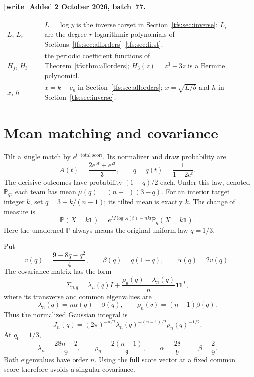 \documentclass[11pt,a4paper]{article}
\numberwithin{equation}{section}
\theoremstyle{remark}
\newcommand{\Prob}{\mathbb P}
\newcommand{\1}{\mathbf 1}
\newenvironment{writenote}[1][]{\par\smallskip\begingroup\small
 \noindent\textbf{[write]}\if\relax\detokenize{#1}\relax\else~\textbf{#1.}\fi\ }%
 {\par\endgroup\smallskip}
\begin{document}
\begin{writenote}[Added 2 October 2026, batch~77]
\begin{center}
\begin{tabular}{@{}p{0.15\linewidth}p{0.79\linewidth}@{}}
$L$, $L_r$ & $L=\log y$ is the inverse target in Section~\ref{tfs:sec:inverse}; $L_r$ are the degree-$r$ logarithmic polynomials of Sections~\ref{tfs:sec:allorders}--\ref{tfs:sec:first}.\\
$H_j$, $H_3$ & the periodic coefficient functions of Theorem~\ref{tfs:thm:allorders}; $H_3(z)=z^3-3z$ is a Hermite polynomial.\\
$x$, $h$ & $x=k-c_n$ in Section~\ref{tfs:sec:allorders}; $x=\sqrt{L/b}$ and $h$ in Section~\ref{tfs:sec:inverse}.\\
\bottomrule
\end{tabular}
\end{center}
\end{writenote}

\section{Mean matching and covariance}\label{tfs:sec:tilt}
Tilt a single match by $e^{t\cdot\text{total score}}$. Its normalizer and
draw probability are
\[
A(t)=\frac{2e^{3t}+e^{2t}}3,\qquad q=q(t)=\frac1{1+2e^t}.
\]
The decisive outcomes have probability $(1-q)/2$ each. Under this law,
denoted $\Prob_q$, each team has mean
$\mu(q)=(n-1)(3-q)$. For an interior target integer $k$, set
$q=3-k/(n-1)$; its tilted mean is exactly $k$. The change of measure is
\begin{equation}\label{tfs:eq:tilt}
\Prob(X=k\1)=e^{M\log A(t)-nkt}\Prob_q(X=k\1).
\end{equation}
Here the unadorned $\Prob$ always means the original uniform law $q=1/3$.

Put
\[
v(q)=\frac{9-8q-q^2}{4},\qquad \beta(q)=q(1-q),\qquad
\alpha(q)=2v(q).
\]
The covariance matrix has the form
\begin{equation}\label{tfs:eq:sigma}
\Sigma_{n,q}=\lambda_n(q)I+
                 \frac{\rho_n(q)-\lambda_n(q)}n\1\1^T,
\end{equation}
where its transverse and common eigenvalues are
\begin{equation}\label{tfs:eq:eigen}
\lambda_n(q)=n\alpha(q)-\beta(q),\qquad
\rho_n(q)=(n-1)\beta(q).
\end{equation}
Thus the normalized Gaussian integral is
\begin{equation}\label{tfs:eq:J}
J_n(q)=(2\pi)^{-n/2}\lambda_n(q)^{-(n-1)/2}\rho_n(q)^{-1/2}.
\end{equation}
At $q_0=1/3$,
\begin{equation}\label{tfs:eq:baseeig}
\lambda_n=\frac{28n-2}{9},\qquad \rho_n=\frac{2(n-1)}9,
\qquad \alpha=\frac{28}9,\qquad\beta=\frac29.
\end{equation}
Both eigenvalues have order $n$. Using the full score vector at a fixed
common score therefore avoids a singular covariance.
\end{document}
